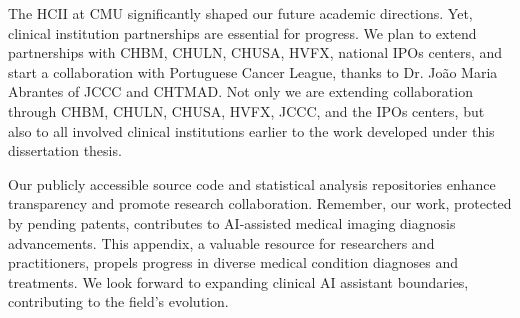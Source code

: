 The \ac{HCII} at \ac{CMU} significantly shaped our future academic directions.
Yet, clinical institution partnerships are essential for progress.
We plan to extend partnerships with \ac{CHBM}, \ac{CHULN}, \ac{CHUSA}, \ac{HVFX}, national \acp{IPO} centers, and start a collaboration with Portuguese Cancer League, thanks to Dr. João Maria Abrantes of \ac{JCCC} and \ac{CHTMAD}.
Not only we are extending collaboration through \ac{CHBM}, \ac{CHULN}, \ac{CHUSA}, \ac{HVFX}, \ac{JCCC}, and the \acp{IPO} centers, but also to all involved clinical institutions earlier to the work developed under this dissertation thesis.

Our publicly accessible source code and statistical analysis repositories enhance transparency and promote research collaboration.
Remember, our work, protected by pending patents, contributes to \ac{AI}-assisted medical imaging diagnosis advancements.
This appendix, a valuable resource for researchers and practitioners, propels progress in diverse medical condition diagnoses and treatments.
We look forward to expanding clinical \ac{AI} assistant boundaries, contributing to the field's evolution.